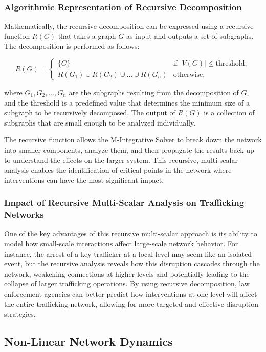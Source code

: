 \documentclass[%
 preprint, linenumbers,
 amsmath,amssymb,
 aps, physrev,
]{revtex4-2}
\begin{document}
\subsubsection{Algorithmic Representation of Recursive Decomposition}

Mathematically, the recursive decomposition can be expressed using a recursive function \( R(G) \) that takes a graph \( G \) as input and outputs a set of subgraphs. The decomposition is performed as follows:

\[
R(G) = \begin{cases} 
    \{ G \} & \text{if } |V(G)| \leq \text{threshold}, \\
    R(G_1) \cup R(G_2) \cup \dots \cup R(G_n) & \text{otherwise}, 
\end{cases}
\]

where \( G_1, G_2, \dots, G_n \) are the subgraphs resulting from the decomposition of \( G \), and the threshold is a predefined value that determines the minimum size of a subgraph to be recursively decomposed. The output of \( R(G) \) is a collection of subgraphs that are small enough to be analyzed individually.

The recursive function allows the M-Integrative Solver to break down the network into smaller components, analyze them, and then propagate the results back up to understand the effects on the larger system. This recursive, multi-scalar analysis enables the identification of critical points in the network where interventions can have the most significant impact.

\subsubsection{Impact of Recursive Multi-Scalar Analysis on Trafficking Networks}

One of the key advantages of this recursive multi-scalar approach is its ability to model how small-scale interactions affect large-scale network behavior. For instance, the arrest of a key trafficker at a local level may seem like an isolated event, but the recursive analysis reveals how this disruption cascades through the network, weakening connections at higher levels and potentially leading to the collapse of larger trafficking operations. By using recursive decomposition, law enforcement agencies can better predict how interventions at one level will affect the entire trafficking network, allowing for more targeted and effective disruption strategies.
\subsection{Non-Linear Network Dynamics}
\end{document}
